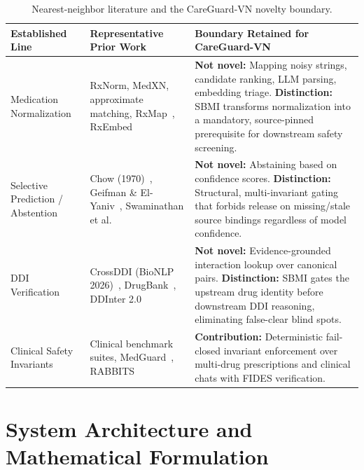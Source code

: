 \documentclass[11pt]{article}
\begin{document}
\begin{table}[H]
\centering
\caption{Nearest-neighbor literature and the CareGuard-VN novelty boundary.}
\label{tab:novelty}
\scriptsize
\begin{tabularx}{\textwidth}{p{2.6cm}p{3.0cm}X}
\toprule
\textbf{Established Line} & \textbf{Representative Prior Work} & \textbf{Boundary Retained for CareGuard-VN} \\
\midrule
Medication Normalization & RxNorm, MedXN, approximate matching, RxMap~\cite{korpela2026rxmap}, RxEmbed~\cite{huser2025rxembed} & \textbf{Not novel:} Mapping noisy strings, candidate ranking, LLM parsing, embedding triage. \textbf{Distinction:} SBMI transforms normalization into a mandatory, source-pinned prerequisite for downstream safety screening. \\
\addlinespace
Selective Prediction / Abstention & Chow (1970)~\cite{chow1970}, Geifman \& El-Yaniv~\cite{geifman2017selective}, Swaminathan et al.~\cite{swaminathan2024selective} & \textbf{Not novel:} Abstaining based on confidence scores. \textbf{Distinction:} Structural, multi-invariant gating that forbids release on missing/stale source bindings regardless of model confidence. \\
\addlinespace
DDI Verification & CrossDDI (BioNLP 2026)~\cite{crossddi2026}, DrugBank~\cite{wishart2018drugbank}, DDInter 2.0~\cite{tian2025ddinter} & \textbf{Not novel:} Evidence-grounded interaction lookup over canonical pairs. \textbf{Distinction:} SBMI gates the upstream drug identity before downstream DDI reasoning, eliminating false-clear blind spots. \\
\addlinespace
Clinical Safety Invariants & Clinical benchmark suites, MedGuard~\cite{chen2024medguard}, RABBITS~\cite{gallifant2024rabbits} & \textbf{Contribution:} Deterministic fail-closed invariant enforcement over multi-drug prescriptions and clinical chats with FIDES verification. \\
\bottomrule
\end{tabularx}
\end{table}

\section{System Architecture and Mathematical Formulation}
\end{document}
